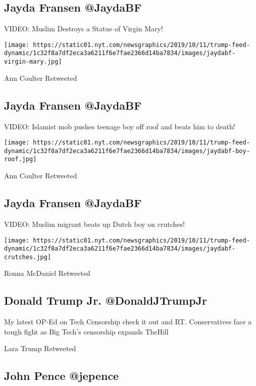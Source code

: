 \hypertarget{jayda-fransen-jaydabf}{%
\subsection{Jayda Fransen @JaydaBF}\label{jayda-fransen-jaydabf}}

VIDEO: Muslim Destroys a Statue of Virgin Mary!

\texttt{[image: https://static01.nyt.com/newsgraphics/2019/10/11/trump-feed-dynamic/1c32f8a7df2eca3a6211f6e7fae2366d14ba7834/images/jaydabf-virgin-mary.jpg]}

Ann Coulter Retweeted

\hypertarget{jayda-fransen-jaydabf-1}{%
\subsection{Jayda Fransen @JaydaBF}\label{jayda-fransen-jaydabf-1}}

VIDEO: Islamist mob pushes teenage boy off roof and beats him to death!

\texttt{[image: https://static01.nyt.com/newsgraphics/2019/10/11/trump-feed-dynamic/1c32f8a7df2eca3a6211f6e7fae2366d14ba7834/images/jaydabf-boy-roof.jpg]}

Ann Coulter Retweeted

\hypertarget{jayda-fransen-jaydabf-2}{%
\subsection{Jayda Fransen @JaydaBF}\label{jayda-fransen-jaydabf-2}}

VIDEO: Muslim migrant beats up Dutch boy on crutches!

\texttt{[image: https://static01.nyt.com/newsgraphics/2019/10/11/trump-feed-dynamic/1c32f8a7df2eca3a6211f6e7fae2366d14ba7834/images/jaydabf-crutches.jpg]}

Ronna McDaniel Retweeted

\hypertarget{donald-trump-jr-donaldjtrumpjr}{%
\subsection{Donald Trump Jr.
@DonaldJTrumpJr}\label{donald-trump-jr-donaldjtrumpjr}}

My latest OP-Ed on Tech Censorship check it out and RT. Conservatives
face a tough fight as Big Tech's censorship expands \textbar{} TheHill

Lara Trump Retweeted

\hypertarget{john-pence-jepence}{%
\subsection{John Pence @jepence}\label{john-pence-jepence}}


